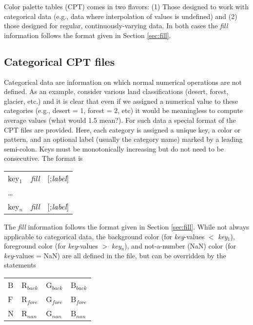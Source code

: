 Color palette tables (CPT) comes in two flavors: (1) Those designed to work with
categorical data (e.g., data where interpolation of values is undefined) and
(2) those designed for regular, continuously-varying data.  In both cases
the \emph{fill} information follows the format given in Section \ref{sec:fill}.

\subsection{Categorical CPT files}

Categorical data are information on which normal numerical operations are not
defined. As an example, consider various land classifications (desert, forest, glacier, etc.)
and it is clear that even if we assigned a numerical value to these categories (e.g.,
desert = 1, forest = 2, etc) it would be meaningless to compute average values (what would
1.5 mean?).  For such data a special format of the CPT files are provided.  Here,
each category is assigned a unique key, a color or pattern, and an optional
label (usually the category name) marked by a leading semi-colon.  Keys must be
monotonically increasing but do not need to be consecutive.  The format is

\begin{center}
\begin{tabular}{lll}
key$_1$ &  \emph{fill} &  [;\emph{label}] \\
\ldots & & \\
key$_n$ &  \emph{fill} &  [;\emph{label}] \\
\end{tabular}
\end{center}

The \emph{fill} information follows the format given in Section \ref{sec:fill}.
While not always applicable to categorical data, the background color (for
\emph{key}-values $<$ \emph{key$_1$}), foreground color
(for \emph{key}-values $>$ \emph{key$_{n}$}), and not-a-number (NaN) color (for
\emph{key}-values = NaN) are all defined in the 
file, but can be overridden by the statements

\begin{center}
\begin{tabular}{llll}
B &  R$_{back}$ &  G$_{back}$ &  B$_{back}$ \\
F &  R$_{fore}$ &  G$_{fore}$ &  B$_{fore}$ \\
N &  R$_{nan}$ &  G$_{nan}$ &  B$_{nan}$ \\
\end{tabular}
\end{center}

